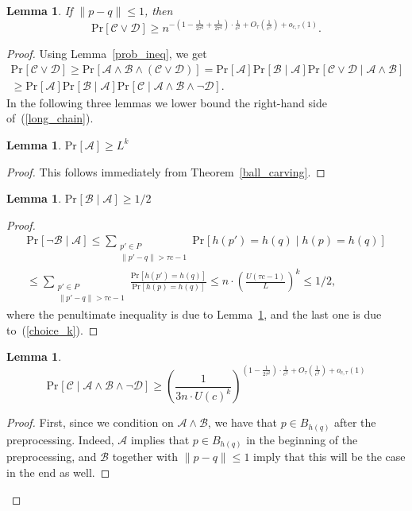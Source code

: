 \documentclass[11pt,letterpaper]{article}
\newtheorem{lemma}[theorem]{Lemma}
\newcommand{\Prb}[2]{\mathrm{Pr}_{#1}\left[#2\right]}
\newcommand{\Ac}{\mathcal{A}}
\newcommand{\Bc}{\mathcal{B}}
\newcommand{\Cc}{\mathcal{C}}
\newcommand{\Dc}{\mathcal{D}}
\begin{document}
\begin{lemma}
    \label{lower_coll_lemma}
    If $\|p - q\| \leq 1$, then
    $$
        \mathrm{Pr}[\mathcal{C} \vee \mathcal{D}] \geq
        n^{-\left(1 - \frac{1}{2 \tau^2} + \frac{1}{2 \tau^4}\right) \cdot \frac{1}{c^2} + O_{\tau}\left(\frac{1}{c^3}\right) + o_{c, \tau}(1)}.
    $$
\end{lemma}
\begin{proof}
    Using Lemma~\ref{prob_ineq}, we get
    \begin{multline}
        \label{long_chain}
        \Prb{}{\Cc \vee \Dc} \geq \Prb{}{\Ac \wedge \Bc \wedge (\Cc \vee \Dc)} = \Prb{}{\Ac} \Prb{}{\Bc \mid \Ac} \Prb{}{\Cc \vee \Dc \mid \Ac \wedge \Bc} 
        \\ \geq \Prb{}{\Ac} \Prb{}{\Bc \mid \Ac} \Prb{}{\Cc \mid \Ac \wedge \Bc \wedge \neg \Dc}.
    \end{multline}
    In the following three lemmas we lower bound the right-hand side of~(\ref{long_chain}).
    \begin{lemma}
        \label{prob_a}
        $\Prb{}{\Ac} \geq L^{k}$
    \end{lemma}
    \begin{proof}
        This follows immediately from Theorem~\ref{ball_carving}.
    \end{proof}
    \begin{lemma}
        \label{prob_b}
        $\Prb{}{\Bc \mid \Ac} \geq 1/2$
    \end{lemma}
    \begin{proof}
        \begin{multline*}
            \Prb{}{\neg \Bc \mid \Ac} \leq \sum_{\begin{smallmatrix}p' \in P \\ \|p' - q\| > \tau c - 1\end{smallmatrix}} \Prb{}{h(p') = h(q) \mid h(p) = h(q)} \\ \leq \sum_{\begin{smallmatrix}p' \in P \\ \|p' - q\| > \tau c - 1\end{smallmatrix}}
            \frac{\Prb{}{h(p') = h(q)}}{\Prb{}{h(p) = h(q)}} \leq n \cdot \left(\frac{U(\tau c - 1)}{L}\right)^k \leq
            1 / 2,
        \end{multline*}
        where the penultimate inequality is due to Lemma~\ref{prob_a}, and the last one is due to~(\ref{choice_k}).
    \end{proof}
    \begin{lemma}
        \label{prob_c}
        $$
            \Prb{}{\Cc \mid \Ac \wedge \Bc \wedge \neg \Dc} \geq \left(\frac{1}{3n \cdot U(c)^k}\right)^{\left(1 - \frac{1}{2\tau^2}\right)\cdot \frac{1}{c^2} + O_{\tau}\left(\frac{1}{c^3}\right) + o_{c, \tau}(1)}
        $$
    \end{lemma}
    \begin{proof}
        First, since we condition on $\Ac \wedge \Bc$, we have that $p \in B_{h(q)}$ after the preprocessing.
        Indeed, $\Ac$ implies that $p \in B_{h(q)}$ in the beginning of the preprocessing,
        and $\Bc$ together with $\|p - q\| \leq 1$ imply that this will be the case in the end as well.


\end{proof}
\end{proof}
\end{document}
